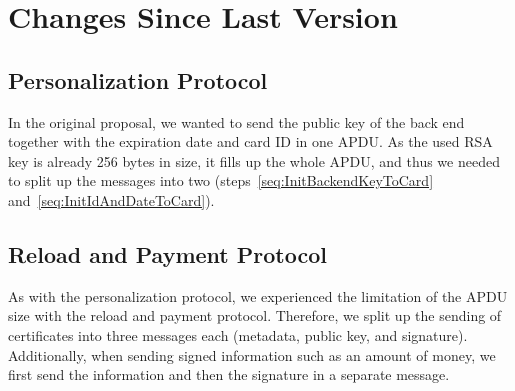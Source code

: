 \documentclass{article}
\begin{document}
\section{Changes Since Last Version}
    \subsection{Personalization Protocol}
    In the original proposal, we wanted to send the public key of the back end together with the expiration date and card ID in one APDU\@.
    As the used RSA key is already 256 bytes in size, it fills up the whole APDU, and thus we needed to split up the messages into two (steps~\ref{seq:InitBackendKeyToCard} and~\ref{seq:InitIdAndDateToCard}).

    \subsection{Reload and Payment Protocol}
    As with the personalization protocol, we experienced the limitation of the APDU size with the reload and payment protocol.
    Therefore, we split up the sending of certificates into three messages each (metadata, public key, and signature).
    Additionally, when sending signed information such as an amount of money, we first send the information and then the signature in a separate message.
\end{document}
